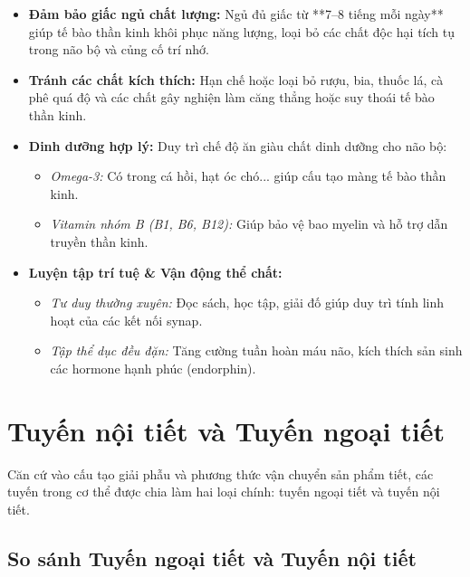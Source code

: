 \begin{itemize}
    \item \textbf{Đảm bảo giấc ngủ chất lượng:} Ngủ đủ giấc từ **7--8 tiếng mỗi ngày** giúp tế bào thần kinh khôi phục năng lượng, loại bỏ các chất độc hại tích tụ trong não bộ và củng cố trí nhớ.
    \item \textbf{Tránh các chất kích thích:} Hạn chế hoặc loại bỏ rượu, bia, thuốc lá, cà phê quá độ và các chất gây nghiện làm căng thẳng hoặc suy thoái tế bào thần kinh.
    \item \textbf{Dinh dưỡng hợp lý:} Duy trì chế độ ăn giàu chất dinh dưỡng cho não bộ:
    \begin{itemize}
        \item \textit{Omega-3:} Có trong cá hồi, hạt óc chó... giúp cấu tạo màng tế bào thần kinh.
        \item \textit{Vitamin nhóm B (B1, B6, B12):} Giúp bảo vệ bao myelin và hỗ trợ dẫn truyền thần kinh.
    \end{itemize}
    \item \textbf{Luyện tập trí tuệ \& Vận động thể chất:}
    \begin{itemize}
        \item \textit{Tư duy thường xuyên:} Đọc sách, học tập, giải đố giúp duy trì tính linh hoạt của các kết nối synap.
        \item \textit{Tập thể dục đều đặn:} Tăng cường tuần hoàn máu não, kích thích sản sinh các hormone hạnh phúc (endorphin).
    \end{itemize}
\end{itemize}


\section{Tuyến nội tiết và Tuyến ngoại tiết}

Căn cứ vào cấu tạo giải phẫu và phương thức vận chuyển sản phẩm tiết, các tuyến trong cơ thể được chia làm hai loại chính: tuyến ngoại tiết và tuyến nội tiết.

\subsection{So sánh Tuyến ngoại tiết và Tuyến nội tiết}


